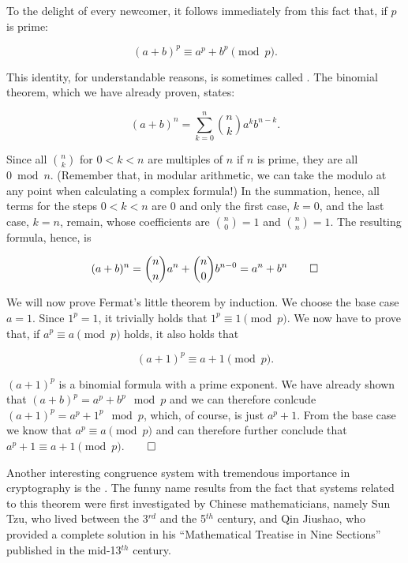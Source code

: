 \documentclass{scrreprt}
\begin{document}
To the delight of every newcomer,
it follows immediately from this fact that,
if $p$ is prime:

\begin{equation}\label{eqCong_binom1}
(a + b)^p \equiv a^p + b^p \pmod p.
\end{equation}

This identity, for understandable reasons,
is sometimes called .
The binomial theorem, which we have already proven, states:

\begin{equation}
(a + b)^n = \sum_{k=0}^{n}{\binom{n}{k}a^kb^{n-k}}.
\end{equation}

Since all $\binom{n}{k}$ for $0 < k < n$ are multiples of $n$
if $n$ is prime, they are all $0 \bmod n$.
(Remember that, in modular arithmetic, we can take the modulo
at any point when calculating a complex formula!)
In the summation, hence, all terms for the steps
$0 < k < n$ are 0 and only the first case, $k=0$, 
and the last case, $k=n$, remain,
whose coefficients are $\binom{n}{0} = 1$ and $\binom{n}{n} = 1$.
The resulting formula, hence, is 

\[
(a + b)^n = \binom{n}{n}a^{n} + \binom{n}{0}b^{n-0} = a^n + b^n\qed
\]

We will now prove Fermat's little theorem by induction.
We choose the base case $a = 1$.
Since $1^p = 1$, it trivially holds that $1^p \equiv 1 \pmod{p}$.
We now have to prove that, if $a^p \equiv a \pmod{p}$ holds,
it also holds that 

\begin{equation}
(a+1)^p \equiv a+1 \pmod{p}.
\end{equation}

$(a+1)^p$ is a binomial formula with a prime exponent.
We have already shown that $(a+b)^p = a^p + b^p \mod p$
and we can therefore conlcude $(a+1)^p = a^p + 1^p \mod p$,
which, of course, is just $a^p + 1$.
From the base case we know that $a^p \equiv a \pmod p$
and can therefore further conclude that 
$a^p + 1 \equiv a + 1 \pmod{p}$.$\qed$

Another interesting congruence system 
with tremendous importance in cryptography is the 
.
The funny name results from the fact
that systems related to this theorem
were first investigated by Chinese mathematicians,
namely Sun Tzu, who lived between the 3$^{rd}$ and
the 5$^{th}$ century, and Qin Jiushao,
who provided a complete solution in his
``Mathematical Treatise in Nine Sections''
published in the mid-13$^{th}$ century.
\end{document}
